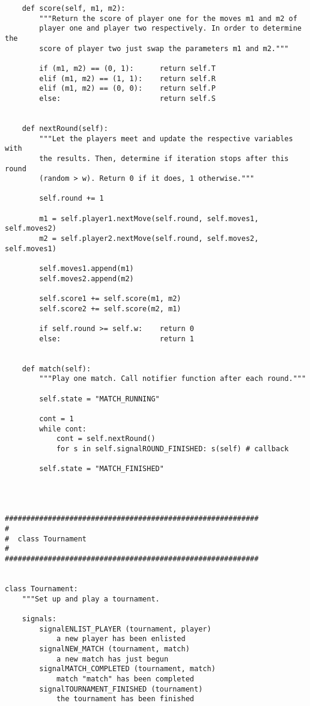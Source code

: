 \documentclass[12pt,a4paper,ngerman]{article}
\begin{document}
\begin{scriptsize}
\begin{verbatim}
    def score(self, m1, m2):
        """Return the score of player one for the moves m1 and m2 of
        player one and player two respectively. In order to determine the
        score of player two just swap the parameters m1 and m2."""

        if (m1, m2) == (0, 1):      return self.T
        elif (m1, m2) == (1, 1):    return self.R
        elif (m1, m2) == (0, 0):    return self.P
        else:                       return self.S


    def nextRound(self):
        """Let the players meet and update the respective variables with
        the results. Then, determine if iteration stops after this round
        (random > w). Return 0 if it does, 1 otherwise."""

        self.round += 1
        
        m1 = self.player1.nextMove(self.round, self.moves1, self.moves2)
        m2 = self.player2.nextMove(self.round, self.moves2, self.moves1)

        self.moves1.append(m1)
        self.moves2.append(m2)

        self.score1 += self.score(m1, m2)
        self.score2 += self.score(m2, m1)

        if self.round >= self.w:    return 0
        else:                       return 1


    def match(self):
        """Play one match. Call notifier function after each round."""

        self.state = "MATCH_RUNNING"

        cont = 1
        while cont:
            cont = self.nextRound()
            for s in self.signalROUND_FINISHED: s(self) # callback

        self.state = "MATCH_FINISHED"




###########################################################
#
#  class Tournament
#
###########################################################


class Tournament:
    """Set up and play a tournament.

    signals:
        signalENLIST_PLAYER (tournament, player)
            a new player has been enlisted
        signalNEW_MATCH (tournament, match)
            a new match has just begun
        signalMATCH_COMPLETED (tournament, match)
            match "match" has been completed
        signalTOURNAMENT_FINISHED (tournament)          
            the tournament has been finished


\end{verbatim}
\end{scriptsize}
\end{document}
